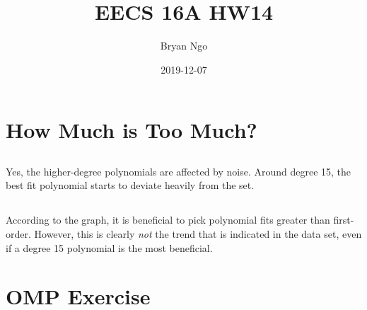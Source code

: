\documentclass[]{article}
\title{EECS 16A HW14}
\author{Bryan Ngo}
\date{2019-12-07}
\begin{document}
\maketitle

\section{How Much is Too Much?}

\subsection{}

Yes, the higher-degree polynomials are affected by noise. 
Around degree 15, the best fit polynomial starts to deviate heavily from the set. 

\subsection{}

According to the graph, it is beneficial to pick polynomial fits greater than first-order. 
However, this is clearly \emph{not} the trend that is indicated in the data set, even if a degree 15 polynomial is the most beneficial. 

\section{OMP Exercise}
\end{document}
